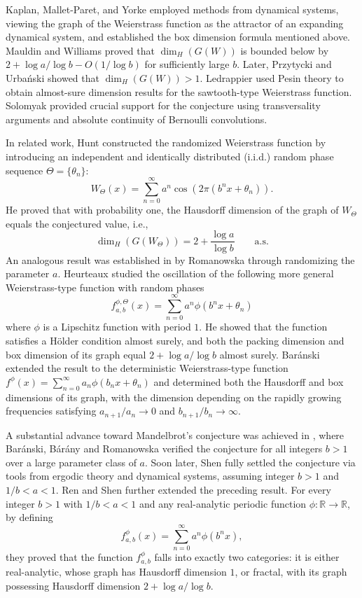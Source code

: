 \documentclass[12pt, reqno]{amsart}
\theoremstyle{plain}
\theoremstyle{definition}
\theoremstyle{remark}
\begin{document}
Kaplan, Mallet-Paret, and Yorke \cite{Kaplan1984} employed methods from dynamical systems, viewing the graph of the Weierstrass function as the attractor of an expanding dynamical system, and established the box dimension formula mentioned above. Mauldin and Williams \cite{Mauldin1986} proved that $\dim_H(G(W))$ is bounded below by $2+{\log a}/{\log b}-O(1/{\log b})$ for sufficiently large $b$. Later, Przytycki and Urbański \cite{Przytycki1989} showed that $\dim_H(G(W))>1$. Ledrappier \cite{Ledrappier1992} used Pesin theory to obtain almost-sure dimension results for the sawtooth-type Weierstrass function.  Solomyak \cite{Solomyak1995} provided crucial support for the conjecture using transversality arguments and absolute continuity of Bernoulli convolutions. 

In related work, Hunt \cite{Hunt1998} constructed the randomized Weierstrass function by introducing an independent and identically distributed (i.i.d.) random phase sequence \(\Theta=\{\theta_n\}\):
\[
W_{\Theta}(x) = \sum_{n=0}^{\infty} a^n \cos\left(2\pi \left(b^n x + \theta_n\right)\right).
\]
He proved that with probability one, the Hausdorff dimension of the graph of $W_{\Theta}$ equals the conjectured value, i.e.,
\[
\dim_H(G(W_{\Theta}))=2+\frac{\log a}{\log b} \qquad \text{a.s.}
\]
An analogous result was established in \cite{Rom2014} by Romanowska through randomizing the parameter $a$. Heurteaux \cite{Heurteaux2003} studied the oscillation of  the following more general Weierstrass-type function with random phases
\[
f_{a,b}^{\phi,\Theta}(x) = \sum_{n=0}^\infty a^n \phi(b^n x + \theta_n)
\]
where $\phi$ is a Lipschitz function with period $1$. He showed that the function satisfies a H\"older condition almost surely, and both the packing dimension and box dimension of its graph equal $2 + {\log a}/{\log b}$ almost surely.  Baránski \cite{Baranski2012} extended the result to the   deterministic Weierstrass-type function $f^\phi(x) = \sum_{n=0}^\infty a_n \phi(b_n x +\theta_n)$ and determined  both the Hausdorff and box dimensions of its graph, with the dimension depending on the rapidly growing frequencies satisfying \(a_{n+1}/a_n\to 0\) and \(b_{n+1}/b_n\to \infty\).


A substantial advance toward Mandelbrot’s conjecture was achieved in \cite{Baranski2014}, where Baránski, Bárány and Romanowska verified the conjecture for all integers \(b>1\) over a large parameter class of $a$. Soon later, Shen \cite{Shen2018} fully settled the conjecture via tools from ergodic theory and dynamical systems, assuming integer \(b>1\) and \(1/b<a<1\). Ren and Shen \cite{Ren2021} further extended the preceding result. For every integer \(b>1\) with \(1/b<a<1\) and any real-analytic periodic function \(\phi:\mathbb{R}\to\mathbb{R}\), by defining 
\begin{equation}\label{w-function 1}
	f_{a,b}^\phi(x) = \sum_{n=0}^\infty a^n \phi(b^n x), 
\end{equation} they proved that the function \(f_{a,b}^\phi\) falls into exactly two categories: it is either real-analytic, whose graph has Hausdorff dimension $1$, or fractal, with its graph possessing Hausdorff dimension \(2+{\log a}/{\log b}\).
\end{document}
